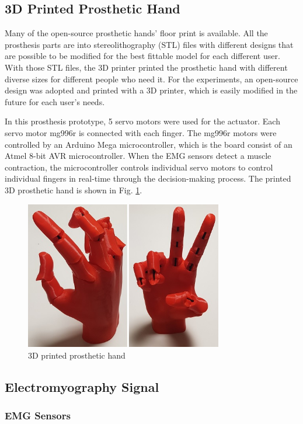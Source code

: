 \documentclass[conference]{IEEEtran}
\begin{document}
\subsection{3D Printed Prosthetic Hand}
Many of the open-source prosthetic hands' floor print is available. All the prosthesis parts are into stereolithography (STL) files with different designs that are possible to be modified for the best fittable model for each different user. With those STL files, the 3D printer printed the prosthetic hand with different diverse sizes for different people who need it. For the experiments, an open-source design was adopted and printed with a 3D printer, which is easily modified in the future for each user's needs.


In this prosthesis prototype, 5 servo motors were used for the actuator. Each servo motor mg996r is connected with each finger. The mg996r motors were controlled by an Arduino Mega microcontroller, which is the board consist of an Atmel 8-bit AVR microcontroller. When the EMG sensors detect a muscle contraction, the microcontroller controls individual servo motors to control individual fingers in real-time through the decision-making process. The printed 3D prosthetic hand is shown in Fig. \ref{hand}.

\begin{figure}[h]
  \centering
  \includegraphics[width=3.4in]{3dhand3.jpg}
  \caption{3D printed prosthetic hand}
  \label{hand}
\end{figure}


\subsection{Electromyography Signal}

\subsubsection{EMG Sensors}
\end{document}
